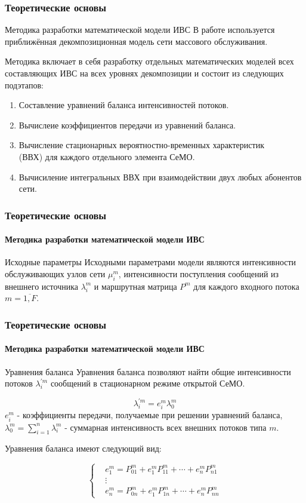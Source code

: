 \documentclass[aspectratio=169]{beamer}
\begin{document}
\begin{frame}
\frametitle{Теоретические основы}

\begin{block}{Методика разработки математической модели ИВС}
В работе используется приближённая декомпозиционная модель сети массового обслуживания.

Методика включает в себя разработку отдельных математических моделей всех составляющих ИВС на всех уровнях декомпозиции и состоит из следующих подэтапов:
\begin{enumerate}
	\item  Составление уравнений баланса интенсивностей потоков.
	\item  Вычислеие коэффициентов передачи из уравнений баланса.
	\item  Вычисление стационарных вероятностно-временных характеристик \\ (ВВХ) для каждого отдельного элемента СеМО.
	\item  Вычисиление интегральных ВВХ при взаимодействии двух любых абонентов сети.
\end{enumerate}
\end{block}
\end{frame}

\begin{frame}
\frametitle{Теоретические основы}
\framesubtitle{Методика разработки математической модели ИВС}
	
\begin{block}{Исходные параметры}
Исходными параметрами модели являются интенсивности обслуживающих узлов сети \( \mu_{i}^{m} \), интенсивности поступления сообщений из внешнего источника
\( \lambda_{i}^{m} \) и маршрутная матрица \( P^{m} \) для каждого входного потока \( m = \overline{1, F} \).
\end{block}
\end{frame}

\begin{frame}
\frametitle{Теоретические основы}
\framesubtitle{Методика разработки математической модели ИВС}

\begin{block}{Уравнения баланса}
Уравнения баланса позволяют найти общие интенсивности потоков \( \lambda_{i}^{'m} \) сообщений в стационарном режиме открытой СеМО.

\[ \lambda_{i}^{'m} = e_{i}^{m} \lambda_{0}^{m} \]
\( e_{i}^{m} \) - коэффициенты передачи, получаемые при решении уравнений баланса,
\( \lambda_{0}^{m} = \sum\limits_{i = 1}^{n} \lambda_{i}^{m}\) - суммарная интенсивность всех внешних потоков типа \( m \).

Уравнения баланса имеют следующий вид:

\[ \left\{
		\begin{aligned}
			& e_{1}^{m} = P_{01}^{m} + e_{1}^{m} P_{11}^{m} + \cdots + e_{n}^{m} P_{n1}^{m} \\
			& \vdots \\
			& e_{n}^{m} = P_{0n}^{m} + e_{1}^{m} P_{1n}^{m} + \cdots + e_{n}^{m} P_{nn}^{m}
		\end{aligned}
	\right. \]
\end{block}
\end{frame}
\end{document}
